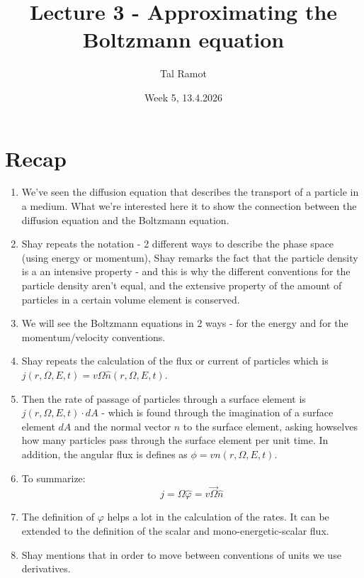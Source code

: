 \documentclass[11pt]{article}
\title{Lecture 3 - Approximating the Boltzmann equation}
\author{Tal Ramot}
\date{Week 5, 13.4.2026}
\begin{document}
\maketitle
\section{Recap}
\begin{enumerate}
    \item We've seen the diffusion equation that describes the transport of a particle in a medium. What we're interested here it to show the connection between the diffusion equation and the Boltzmann equation.
    \item Shay repeats the notation - 2 different ways to describe the phase space (using energy or momentum), Shay remarks the fact that the particle density is a an intensive property - and this is why the different conventions for the particle density aren't equal, and the extensive property of the amount of particles in a certain volume element is conserved.
    \item We will see the Boltzmann equations in 2 ways - for the energy and for the momentum/velocity conventions.
    \item Shay repeats the calculation of the flux or current of particles which is $j(r, \Omega, E, t) = v \Omega \hat n(r, \Omega, E, t)$.
    \item Then the rate of passage of particles through a surface element is $j(r, \Omega, E, t) \cdot dA$ - which is found through the imagination of a surface element $dA$ and the normal vector $\hat n$ to the surface element, asking howselves how many particles pass through the surface element per unit time.
    In addition, the angular flux is defines as $\phi = v n(r,\Omega, E, t)$. 
    \item To summarize:
    \begin{equation}
        j = \Omega\hat \varphi = v\vec \Omega\hat n
    \end{equation}
    \item The definition of $\varphi$ helps a lot in the calculation of the rates. It can be extended to the definition of the scalar and mono-energetic-scalar flux.
    \item Shay mentions that in order to move between conventions of units we use derivatives.
\end{enumerate}
\end{document}
